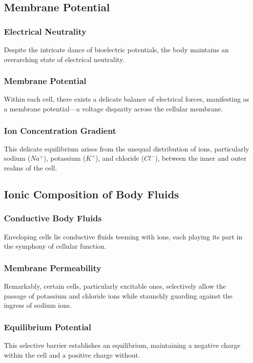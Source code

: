 \documentclass{article}
\begin{document}
\subsection{Membrane Potential}

\subsubsection{Electrical Neutrality}
Despite the intricate dance of bioelectric potentials, the body maintains an overarching state of electrical neutrality.

\subsubsection{Membrane Potential}
Within each cell, there exists a delicate balance of electrical forces, manifesting as a membrane potential—a voltage disparity across the cellular membrane.

\subsubsection{Ion Concentration Gradient}
This delicate equilibrium arises from the unequal distribution of ions, particularly sodium (\(Na^+\)), potassium (\(K^+\)), and chloride (\(Cl^-\)), between the inner and outer realms of the cell.

\subsection{Ionic Composition of Body Fluids}

\subsubsection{Conductive Body Fluids}
Enveloping cells lie conductive fluids teeming with ions, each playing its part in the symphony of cellular function.

\subsubsection{Membrane Permeability}
Remarkably, certain cells, particularly excitable ones, selectively allow the passage of potassium and chloride ions while staunchly guarding against the ingress of sodium ions.

\subsubsection{Equilibrium Potential}
This selective barrier establishes an equilibrium, maintaining a negative charge within the cell and a positive charge without.
\end{document}
